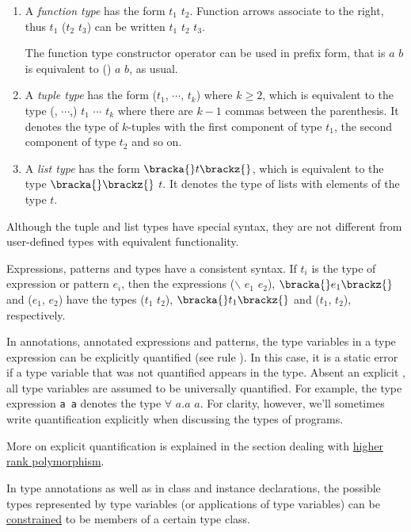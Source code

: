 \begin{enumerate}
\item A \emph{function type} has the form $t_1$ \arrow{} $t_2$. Function arrows associate to the right, thus $t_1$ \arrow{} ($t_2$ \arrow{} $t_3$) can be written $t_1$ \arrow{} $t_2$ \arrow{} $t_3$.

The function type constructor operator can be used in prefix form, that is $a$ \arrow{} $b$ is equivalent to (\arrow{}) $a$ $b$, as usual.

\item A \emph{tuple type} has the form ($t_1$, $\cdots$, $t_k$) where $k\ge{}2$, which is equivalent to the type (, $\cdots$,) $t_1$ $\cdots$ $t_k$ where there are $k-1$ commas between the parenthesis.
It denotes the type of $k$-tuples with the first component of type $t_1$, the second component of type $t_2$ and so on.
\item A \emph{list type} has the form $\bracka{}t\brackz{}$, which is equivalent to the type $\bracka{}\brackz{}$ $t$. It denotes the type of lists with elements of the type $t$.
\end{enumerate}

Although the tuple and list types have special syntax, they are not different from user-defined types with equivalent functionality.

Expressions, patterns and types have a consistent syntax. If $t_i$ is the type of expression or pattern $e_i$, then the expressions
($\backslash$ $e_1$ \arrow{} $e_2$),
$\bracka{}e_1\brackz{}$
and ($e_1$, $e_2$) have the types
($t_1$ \arrow{} $t_2$), $\bracka{}t_1\brackz{}$ and ($t_1$, $t_2$),
respectively.

In annotations, annotated expressions and patterns, the type variables in a type expression can be explicitly  quantified (see rule ). In this case, it is a static error if a type variable that was not quantified appears in the type.
Absent an explicit , all type variables are assumed to be universally quantified. For example, the type expression \texttt{a \arrow{} a} denotes the type $\forall$ $a$.$a$ \arrow{} $a$.
For clarity, however, we'll sometimes write quantification explicitly when discussing the types of \frege{} programs.

More on explicit quantification is explained in the section dealing with \hyperref[higher-rank]{higher rank polymorphism}.

In type annotations as well as in class and instance declarations, the possible types represented by type variables (or applications of type variables) can be \hyperref[constraint]{constrained} to be members of a certain type class. 


